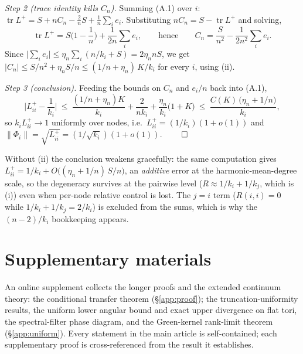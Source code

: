 \documentclass[review]{siamart220329}
\begin{document}
\emph{Step 2 (trace identity kills $C_n$).} Summing (A.1) over $i$:
$\operatorname{tr}L^+=S+nC_n-\tfrac2nS+\tfrac1n\sum_i e_i$. Substituting
$nC_n=S-\operatorname{tr}L^+$ and solving,
\[
\operatorname{tr}L^+=S\Big(1-\frac1n\Big)+\frac{1}{2n}\sum_i e_i,
\qquad\text{hence}\qquad
C_n=\frac{S}{n^2}-\frac{1}{2n^2}\sum_i e_i .
\]
Since $\lvert\sum_i e_i\rvert\le\eta_n\sum_i(n/k_i+S)=2\eta_n nS$, we get
$\lvert C_n\rvert\le S/n^2+\eta_n S/n\le(1/n+\eta_n)\,K/k_i$ for every $i$,
using (ii).

\emph{Step 3 (conclusion).} Feeding the bounds on $C_n$ and $e_i/n$ back into
(A.1),
\[
\Big\lvert L^+_{ii}-\frac1{k_i}\Big\rvert
\ \le\ \frac{(1/n+\eta_n)K}{k_i}+\frac{2}{nk_i}
+\frac{\eta_n}{k_i}\big(1+K\big)
\ \le\ \frac{C(K)\,\big(\eta_n+1/n\big)}{k_i},
\]
so $k_iL^+_{ii}\to1$ uniformly over nodes, i.e.\
$L^+_{ii}=(1/k_i)(1+o(1))$ and $\lVert\Phi_i\rVert=\sqrt{L^+_{ii}}
=(1/\sqrt{k_i})(1+o(1))$. \hfill$\qed$

Without (ii) the conclusion weakens gracefully: the same computation gives
$L^+_{ii}=1/k_i+O\big((\eta_n+1/n)\,S/n\big)$, an \emph{additive} error at the
harmonic-mean-degree scale, so the degeneracy survives at the pairwise level
($R\approx1/k_i+1/k_j$, which is (i)) even when per-node relative control is lost.
The $j{=}i$ term ($R(i,i)=0$ while $1/k_i+1/k_j=2/k_i$) is excluded from the sums,
which is why the $(n-2)/k_i$ bookkeeping appears.


\section*{Supplementary materials}
An online supplement collects the longer proofs and the extended continuum theory:
the conditional transfer theorem (\S\ref{app:proof}); the truncation-uniformity
results, the uniform lower angular bound and exact upper divergence on flat tori,
the spectral-filter phase diagram, and the Green-kernel rank-limit theorem
(\S\ref{app:uniform}). Every statement in the main article is self-contained; each
supplementary proof is cross-referenced from the result it establishes.
\end{document}
